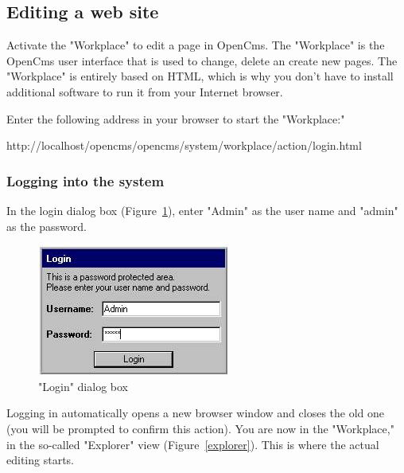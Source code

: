 \subsection{Editing a web site}

Activate the "Workplace" to edit a page in OpenCms. The
"Workplace" is the OpenCms user interface that is used to change,
delete an create new pages. The "Workplace" is entirely based on
HTML, which is why you don't have to install additional software
to run it from your Internet browser.

Enter the following address in your browser to start the
"Workplace:"

http://localhost/opencms/opencms/system/workplace/action/login.html

\subsubsection{Logging into the system}

In the login dialog box (Figure~\ref{loginbox}), enter "Admin" as
the user name and "admin" as the password.

\begin{figure}[hbt]
\begin{minipage}[b]{0.499\linewidth}
   \begin{center}
\includegraphics[width=\sgw]
                   {pics/usermanual/loginBox}
\caption["Login" dialog box]
           {"Login" dialog box}
\label{loginbox}
   \end{center}
\end{minipage}
\hfill
\end{figure}

Logging in automatically opens a new browser window and closes the
old one (you will be prompted to confirm this action). You are now
in the "Workplace," in the so-called "Explorer" view
(Figure~\ref{explorer}). This is where the actual editing starts.

